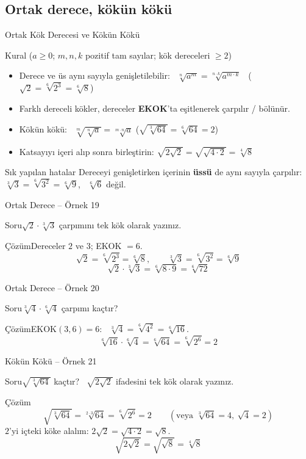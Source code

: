 \documentclass[aspectratio=169,11pt,handout]{beamer}
\newcommand{\soru}[3]{%
\begin{frame}{#1}
  \begin{block}{Soru}\large #2\end{block}
  \pause
  \begin{exampleblock}{Çözüm}\large #3\end{exampleblock}
\end{frame}}
\begin{document}
\subsection{Ortak derece, kökün kökü}
\begin{frame}{Ortak Kök Derecesi ve Kökün Kökü}
\begin{block}{Kural (\(a\ge 0\); \(m,n,k\) pozitif tam sayılar; kök dereceleri \(\ge 2\))}
\begin{itemize}
\item Derece ve üs aynı sayıyla genişletilebilir: \ \(\sqrt[n]{a^m}=\sqrt[n\cdot k]{a^{m\cdot k}}\) \ (\(\sqrt2=\sqrt[6]{2^3}=\sqrt[6]{8}\))
\item Farklı dereceli kökler, dereceler \textbf{EKOK}'ta eşitlenerek çarpılır / bölünür.
\item Kökün kökü: \ \(\sqrt[m]{\sqrt[n]{a}}=\sqrt[m\cdot n]{a}\) \qquad (\(\sqrt{\sqrt[3]{64}}=\sqrt[6]{64}=2\))
\item Katsayıyı içeri alıp sonra birleştirin: \(\sqrt{2\sqrt2}=\sqrt{\sqrt{4\cdot 2}}=\sqrt[4]{8}\)
\end{itemize}
\end{block}
\begin{alertblock}{Sık yapılan hatalar}
Dereceyi genişletirken içerinin \textbf{üssü} de aynı sayıyla çarpılır: \(\sqrt[3]{3}=\sqrt[6]{3^2}=\sqrt[6]{9}\), \ \(\sqrt[6]{6}\) değil.
\end{alertblock}
\end{frame}

\soru{Ortak Derece -- Örnek 19}
{\(\sqrt2\cdot\sqrt[3]{3}\) çarpımını tek kök olarak yazınız.}
{Dereceler \(2\) ve \(3\); EKOK \(=6\).
\[\sqrt2=\sqrt[6]{2^3}=\sqrt[6]{8},\qquad \sqrt[3]{3}=\sqrt[6]{3^2}=\sqrt[6]{9}\]
\[\sqrt2\cdot\sqrt[3]{3}=\sqrt[6]{8\cdot 9}=\sqrt[6]{72}\]}

\soru{Ortak Derece -- Örnek 20}
{\(\sqrt[3]{4}\cdot\sqrt[6]{4}\) çarpımı kaçtır?}
{EKOK\((3,6)=6\): \ \(\sqrt[3]{4}=\sqrt[6]{4^2}=\sqrt[6]{16}\).
\[\sqrt[6]{16}\cdot\sqrt[6]{4}=\sqrt[6]{64}=\sqrt[6]{2^6}=2\]}

\soru{Kökün Kökü -- Örnek 21}
{\(\sqrt{\sqrt[3]{64}}\) kaçtır? \ \(\sqrt{2\sqrt2}\) ifadesini tek kök olarak yazınız.}
{\[\sqrt{\sqrt[3]{64}}=\sqrt[2\cdot 3]{64}=\sqrt[6]{2^6}=2\qquad(\text{veya } \sqrt[3]{64}=4,\ \sqrt4=2)\]
\(2\)'yi içteki köke alalım: \(2\sqrt2=\sqrt{4\cdot 2}=\sqrt8\).
\[\sqrt{2\sqrt2}=\sqrt{\sqrt8}=\sqrt[4]{8}\]}
\end{document}
